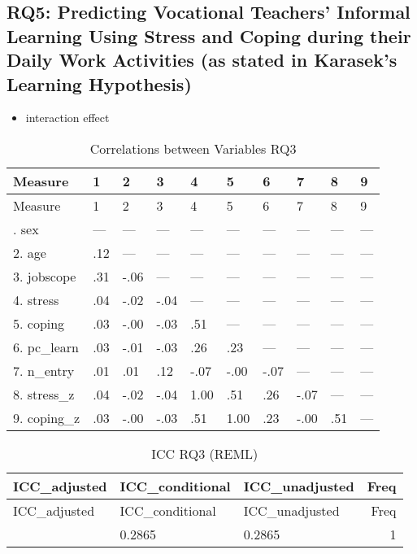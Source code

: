 \documentclass[
]{article}
\providecommand{\tightlist}{%
  \setlength{\itemsep}{0pt}\setlength{\parskip}{0pt}}
\begin{document}
\subsection{RQ5: Predicting Vocational Teachers' Informal Learning Using
Stress and Coping during their Daily Work Activities (as stated in
Karasek's Learning
Hypothesis)}\label{rq5-predicting-vocational-teachers-informal-learning-using-stress-and-coping-during-their-daily-work-activities-as-stated-in-karaseks-learning-hypothesis}

\begin{itemize}
\tightlist
\item
  interaction effect
\end{itemize}

\begin{longtable}[]{@{}llllllllll@{}}
\caption{Correlations between Variables RQ3}\tabularnewline
\toprule\noalign{}
Measure & 1 & 2 & 3 & 4 & 5 & 6 & 7 & 8 & 9 \\
\midrule\noalign{}
\endfirsthead
\toprule\noalign{}
Measure & 1 & 2 & 3 & 4 & 5 & 6 & 7 & 8 & 9 \\
\midrule\noalign{}
\endhead
\bottomrule\noalign{}
\endlastfoot
1. sex & --- & --- & --- & --- & --- & --- & --- & --- & --- \\
2. age & .12 & --- & --- & --- & --- & --- & --- & --- & --- \\
3. jobscope & .31 & -.06 & --- & --- & --- & --- & --- & --- & --- \\
4. stress & .04 & -.02 & -.04 & --- & --- & --- & --- & --- & --- \\
5. coping & .03 & -.00 & -.03 & .51 & --- & --- & --- & --- & --- \\
6. pc\_learn & .03 & -.01 & -.03 & .26 & .23 & --- & --- & --- & --- \\
7. n\_entry & .01 & .01 & .12 & -.07 & -.00 & -.07 & --- & --- & --- \\
8. stress\_z & .04 & -.02 & -.04 & 1.00 & .51 & .26 & -.07 & --- &
--- \\
9. coping\_z & .03 & -.00 & -.03 & .51 & 1.00 & .23 & -.00 & .51 &
--- \\
\end{longtable}

\begin{longtable}[]{@{}lllr@{}}
\caption{ICC RQ3 (REML)}\tabularnewline
\toprule\noalign{}
ICC\_adjusted & ICC\_conditional & ICC\_unadjusted & Freq \\
\midrule\noalign{}
\endfirsthead
\toprule\noalign{}
ICC\_adjusted & ICC\_conditional & ICC\_unadjusted & Freq \\
\midrule\noalign{}
\endhead
\bottomrule\noalign{}
\endlastfoot
0.2865 & 0.2865 & 0.2865 & 1 \\
\end{longtable}
\end{document}
